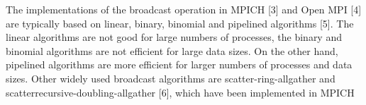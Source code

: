 The implementations of the broadcast operation in MPICH [3] and Open MPI [4] are typically based on linear, binary,
binomial and pipelined algorithms [5]. The linear algorithms are not good for large numbers of processes, the binary and
binomial algorithms are not efficient for large data sizes. On the other hand, pipelined algorithms are more efficient for larger
numbers of processes and data sizes. Other widely used broadcast algorithms are scatter-ring-allgather and scatterrecursive-doubling-allgather
[6], which have been implemented in MPICH